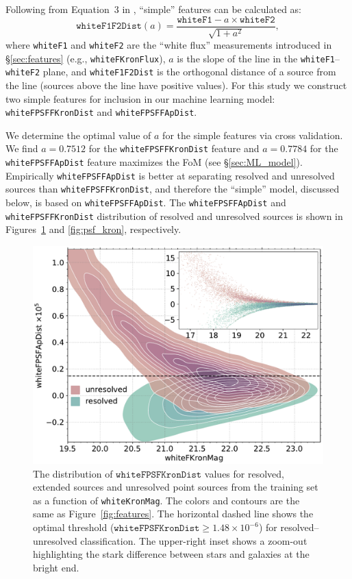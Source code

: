 \documentclass[twocolumn]{aastex63}
\begin{document}
Following from Equation~3 in \citet{Tachibana18}, ``simple'' features can be
calculated as:
%
\begin{equation}
 \mathtt{whiteF1F2Dist}(a) = 
 \frac{\mathtt{whiteF1} - a\times\mathtt{whiteF2}}{ \sqrt{1 + a^2}},
\end{equation}
%
where \texttt{whiteF1} and \texttt{whiteF2} are the ``white flux''
measurements introduced in \S\ref{sec:features} (e.g.,
\texttt{whiteFKronFlux}), $a$ is the slope of the line in the
\texttt{whiteF1}--\texttt{whiteF2} plane, and \texttt{whiteF1F2Dist} is the
orthogonal distance of a source from the line (sources above the line have
positive values). For this study we construct two simple features for
inclusion in our machine learning model: \texttt{whiteFPSFFKronDist} and
\texttt{whiteFPSFFApDist}.

We determine the optimal value of $a$ for the simple features via cross
validation. We find $a = 0.7512$ for the \texttt{whiteFPSFFKronDist} feature
and $a = 0.7784$ for the \texttt{whiteFPSFFApDist} feature maximizes the FoM
(see \S\ref{sec:ML_model}). Empirically \texttt{whiteFPSFFApDist} is better at
separating resolved and unresolved sources than \texttt{whiteFPSFFKronDist},
and therefore the ``simple'' model, discussed below, is based on
\texttt{whiteFPSFFApDist}. The \texttt{whiteFPSFFApDist} and
\texttt{whiteFPSFFKronDist} distribution of resolved and unresolved sources is
shown in Figures~\ref{fig:psf_ap} and \ref{fig:psf_kron}, respectively.

\begin{figure}
    \centering
    \includegraphics[width=\columnwidth]{./figures/whiteFPSFApDist.pdf}
    \caption{The distribution of $\mathtt{whiteFPSFKronDist}$ values for
    resolved, extended sources and unresolved point sources from the training
    set as a function of \texttt{whiteKronMag}. The colors and contours are
    the same as Figure~\ref{fig:features}. The horizontal dashed line shows
    the optimal threshold ($\mathtt{whiteFPSFKronDist} \ge 1.48 \times
    10^{-6}$) for resolved--unresolved classification. The upper-right inset
    shows a zoom-out highlighting the stark difference between stars and
    galaxies at the bright end.}
    \label{fig:psf_ap}
\end{figure}
\end{document}
